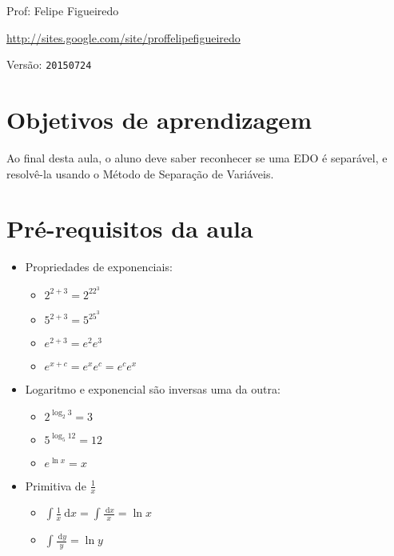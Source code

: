\documentclass[a4paper]{article}
\newcommand{\ud}{\mathrm{\ d}}
\begin{document}
\parbox[c]{.825\textwidth}{\raggedright%
{Prof: Felipe Figueiredo\par}
{\url{http://sites.google.com/site/proffelipefigueiredo}\par}
}

Versão: \verb|20150724|



\section{Objetivos de aprendizagem}

Ao final desta aula, o aluno deve saber reconhecer se uma EDO é
separável, e resolvê-la usando o Método de Separação de Variáveis.

\section{Pré-requisitos da aula}

\begin{multicols}{2}
\begin{itemize}
\item Propriedades de exponenciais:
  \begin{itemize}
  \item $2^{2+3} = 2^22^3$
  \item $5^{2+3} = 5^25^3$
  \item $e^{2+3} = e^2e^3$
  \item $e^{x+c} = e^xe^c = e^ce^x$
  \end{itemize}
\item Logaritmo e exponencial são inversas uma da outra:
  \begin{itemize}
  \item $2^{\log_2 3} = 3$
  \item $5^{\log_5 12} = 12$
  \item $e^{\ln x} = x$
  \end{itemize}
\item Primitiva de $\frac{1}{x}$
  \begin{itemize}
  \item $\int \frac{1}{x} \ud x = \int \frac{\ud x}{x} = \ln x$
  \item $\int \frac{\ud y}{y} = \ln y$
  \end{itemize}
\end{itemize}
\end{multicols}
\end{document}

